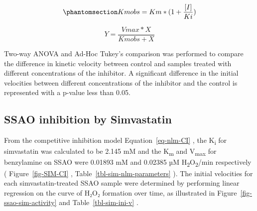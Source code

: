 \documentclass[
  letterpaper,
  DIV=11,
  numbers=noendperiod]{scrreprt}
\begin{document}
\begin{equation}\phantomsection\label{eq-nlm-CI}{
Km obs = Km*{(1+\frac{[I]}{Ki})}
}\end{equation}

\[
Y = \frac{Vmax*X}{Kmobs + X}
\]

Two-way ANOVA and Ad-Hoc Tukey's comparison was performed to compare the
difference in kinetic velocity between control and samples treated with
different concentrations of the inhibitor. A significant difference in
the initial velocities between different concentrations of the inhibitor
and the control is represented with a p-value less than 0.05.

\subsection{SSAO inhibition by
Simvastatin}\label{ssao-inhibition-by-simvastatin}

From the competitive inhibition model Equation~\ref{eq-nlm-CI} , the
K\textsubscript{i} for simvastatin was calculated to be 2.145 mM and the
K\textsubscript{m} and V\textsubscript{max} for benzylamine on SSAO were
0.01893 mM and 0.02385 µM H\textsubscript{2}O\textsubscript{2}/min
respectively ( Figure~\ref{fig-SIM-CI} ,
Table~\ref{tbl-sim-nlm-parameters} ). The initial velocities for each
simvastatin-treated SSAO sample were determined by performing linear
regression on the curve of H₂O₂ formation over time, as illustrated in
Figure~\ref{fig-ssao-sim-activity} and Table~\ref{tbl-sim-ini-v} .
\end{document}
